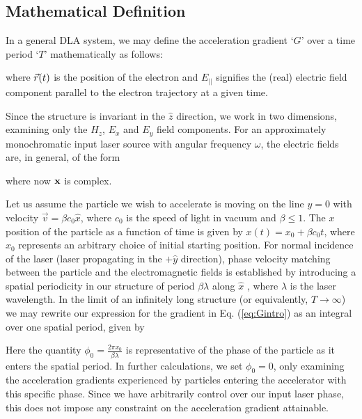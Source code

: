 \subsection{Mathematical Definition}

In a general DLA system, we may define the acceleration gradient `$G$' over a time period `$T$' mathematically as follows:

%
where $\vec{r}(t)$ is the position of the electron and $E_{||}$ signifies the (real) electric field component parallel to the electron trajectory at a given time.

Since the structure is invariant in the $\hat{z}$ direction, we work in two dimensions, examining only the $H_z$, $E_x$ and $E_y$ field components.
For an approximately monochromatic input laser source with angular frequency $\omega$, the electric fields are, in general, of the form

where now $\mathbf{x}$ is complex.

Let us assume the particle we wish to accelerate is moving on the line $y=0$ with velocity $\vec{v} = \beta c_0 \hat{x}$, where $c_0$ is the speed of light in vacuum and $\beta \leq 1$.
The $x$ position of the particle as a function of time is given by $x(t) = x_0 + \beta c_0 t$, where $x_0$ represents an arbitrary choice of initial starting position.
For normal incidence of the laser (laser propagating in the $+\hat{y}$ direction), phase velocity matching between the particle and the electromagnetic fields is established by introducing a spatial periodicity in our structure of period $\beta \lambda$ along $\hat{x}$ , where $\lambda$ is the laser wavelength.
In the limit of an infinitely long structure (or equivalently, $T \to \infty $) we may rewrite our expression for the gradient in Eq. (\ref{eq:Gintro}) as an integral over one spatial period, given by


Here the quantity $\phi_0 = \frac{2\pi x_0}{\beta\lambda}$ is representative of the phase of the particle as it enters the spatial period.
In further calculations, we set $\phi_0 = 0$, only examining the acceleration gradients experienced by particles entering the accelerator with this specific phase.
Since we have arbitrarily control over our input laser phase, this does not impose any constraint on the acceleration gradient attainable.

